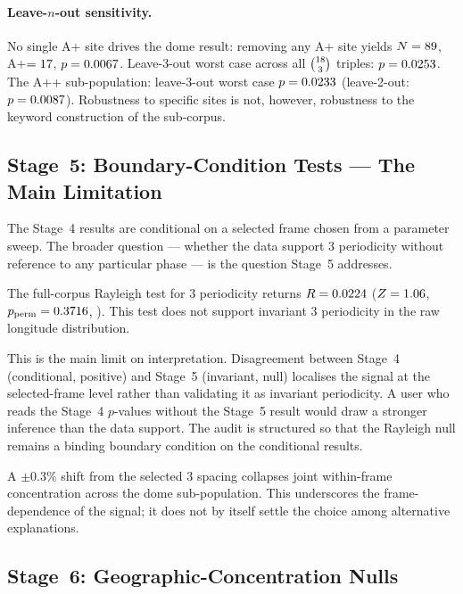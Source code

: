 \documentclass[12pt,a4paper]{article}
\newcommand{\degr}{\ifmmode{^\circ}\else\textdegree{}\fi}
\begin{document}
\paragraph{Leave-$n$-out sensitivity.}
No single A+ site drives the dome result: removing any A+ site yields
$N = 89$, A+$= 17$, $p = 0.0067$.
Leave-3-out worst case across all $\binom{18}{3}$ triples:
$p = 0.0253$. The A++ sub-population: leave-3-out worst case
$p = 0.0233$ (leave-2-out: $p = 0.0087$).
Robustness to specific sites is not, however, robustness to the
keyword construction of the sub-corpus.

\subsection{Stage~5: Boundary-Condition Tests --- The Main Limitation}
\label{sec:boundary}

The Stage~4 results are conditional on a selected frame chosen from a
parameter sweep. The broader question --- whether the data support
3\degr{} periodicity without reference to any particular phase --- is
the question Stage~5 addresses.

The full-corpus Rayleigh test for 3\degr{} periodicity returns
$R = 0.0224$ ($Z = 1.06$,
$p_{\mathrm{perm}} = 0.3716$, \fullRayleighPermPSig{}).
This test does not support invariant 3\degr{} periodicity in the raw
longitude distribution.

This is the main limit on interpretation. Disagreement between Stage~4
(conditional, positive) and Stage~5 (invariant, null) localises the
signal at the selected-frame level rather than validating it as
invariant periodicity. A user who reads the Stage~4 $p$-values without
the Stage~5 result would draw a stronger inference than the data
support. The audit is structured so that the Rayleigh null remains a
binding boundary condition on the conditional results.

A $\pm 0.3\%$ shift from the selected 3\degr{} spacing collapses joint
within-frame concentration across the dome sub-population. This
underscores the frame-dependence of the signal; it does not by itself
settle the choice among alternative explanations.

\subsection{Stage~6: Geographic-Concentration Nulls}
\label{sec:geo_null}
\end{document}
